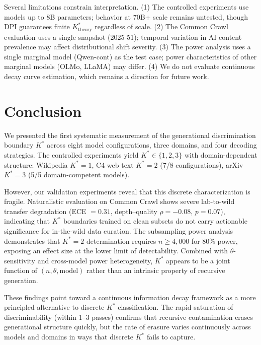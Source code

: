 \documentclass[11pt,a4paper]{article}
\begin{document}
Several limitations constrain interpretation.
(1) The controlled experiments use models up to 8B parameters; behavior at 70B+ scale remains untested, though DPI guarantees finite $K^*_{\text{theory}}$ regardless of scale.
(2) The Common Crawl evaluation uses a single snapshot (2025-51); temporal variation in AI content prevalence may affect distributional shift severity.
(3) The power analysis uses a single marginal model (Qwen-cont) as the test case; power characteristics of other marginal models (OLMo, LLaMA) may differ.
(4) We do not evaluate continuous decay curve estimation, which remains a direction for future work.


\section{Conclusion}

We presented the first systematic measurement of the generational discrimination boundary $K^*$ across eight model configurations, three domains, and four decoding strategies.
The controlled experiments yield $K^* \in \{1,2,3\}$ with domain-dependent structure: Wikipedia $K^*=1$, C4 web text $K^*=2$ (7/8 configurations), arXiv $K^*=3$ (5/5 domain-competent models).

However, our validation experiments reveal that this discrete characterization is fragile.
Naturalistic evaluation on Common Crawl shows severe lab-to-wild transfer degradation (ECE $= 0.31$, depth--quality $\rho = -0.08$, $p = 0.07$), indicating that $K^*$ boundaries trained on clean subsets do not carry actionable significance for in-the-wild data curation.
The subsampling power analysis demonstrates that $K^*=2$ determination requires $n \geq 4{,}000$ for 80\% power, exposing an effect size at the lower limit of detectability.
Combined with $\theta$-sensitivity and cross-model power heterogeneity, $K^*$ appears to be a joint function of $(n, \theta, \text{model})$ rather than an intrinsic property of recursive generation.

These findings point toward a continuous information decay framework as a more principled alternative to discrete $K^*$ classification.
The rapid saturation of discriminability (within 1--3 passes) confirms that recursive contamination erases generational structure quickly, but the rate of erasure varies continuously across models and domains in ways that discrete $K^*$ fails to capture.
\end{document}
